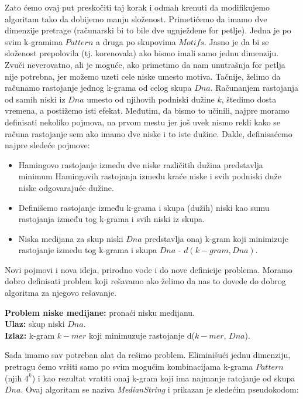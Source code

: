 Zato ćemo ovaj put preskočiti taj korak i odmah krenuti da modifikujemo algoritam tako da dobijemo manju složenost. Primetićemo da imamo dve dimenzije pretrage (računarski bi to bile dve ugnježdene for petlje). Jedna je po svim k-gramima $Pattern$ a druga po skupovima $Motifs$. Jasno je da bi se složenost prepolovila (tj. korenovala) ako bismo imali samo jednu dimenziju. Zvuči neverovatno, ali je moguće, ako primetimo da nam unutrašnja for petlja nije potrebna, jer možemo uzeti cele niske umesto motiva. Tačnije, želimo da računamo rastojanje jednog k-grama od celog skupa $Dna$. Računanjem rastojanja od samih niski iz $Dna$ umesto od njihovih podniski dužine $k$, štedimo dosta vremena, a postižemo isti efekat. Međutim, da bismo to učinili, najpre moramo definisati nekoliko pojmova, na prvom mestu jer još uvek nismo rekli kako se računa rastojanje sem ako imamo dve niske i to iste dužine. Dakle, definisaćemo najpre sledeće pojmove: 

\begin{itemize}
    \item Hamingovo rastojanje izmedu dve niske različitih dužina predstavlja minimum Hamingovih rastojanja između kraće niske i svih podniski duže niske odgovarajuće dužine.
    \item Definišemo rastojanje između k-grama i skupa (dužih) niski kao sumu rastojanja između tog k-grama i svih niski iz skupa.
    \item Niska medijana za skup niski $Dna$ predstavlja onaj k-gram koji minimizuje rastojanje izmedu tog k-grama i skupa $Dna$ - $d(k-gram, Dna)$.
\end{itemize}

Novi pojmovi i nova ideja, prirodno vode i do nove definicije problema. Moramo dobro definisati problem koji rešavamo ako želimo da nas to dovede do dobrog algoritma za njegovo rešavanje.

\begin{tcolorbox}
\textbf{Problem niske medijane:} pronaći nisku medijanu.\\
\textbf{Ulaz:} skup niski $Dna$.\\
\textbf{Izlaz:} k-gram $k-mer$ koji minimuzuje rastojanje d($k-mer$, $Dna$).
\end{tcolorbox}

Sada imamo sav potreban alat da rešimo problem. Eliminišući jednu dimenziju, pretragu ćemo vršiti samo po svim mogućim kombinacijama k-grama $Pattern$ (njih $4^k$) i kao rezultat vratiti onaj k-gram koji ima najmanje ratojanje od skupa $Dna$. Ovaj algoritam se naziva \textit{MedianString} i prikazan je sledećim pseudokodom:

